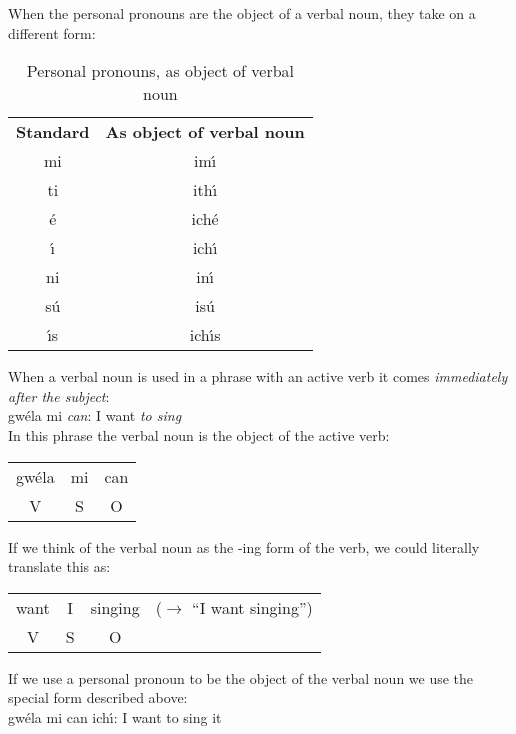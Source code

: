 When the personal pronouns are the object of a verbal noun, they take on a different form:
\begin{table}[H]
\centering
\begin{tabular}{cc}
  \toprule
  \textbf{Standard} & \textbf{As object of verbal noun}\\
  \cmidrule(lr){1-1}\cmidrule(lr){2-2}
  mi & im\'{\i}\\
  ti & ith\'{\i}\\
  \'{e} & ich\'{e}\\
  \'{\i} & ich\'{\i}\\
  ni & in\'{\i}\\
  s\'{u} & is\'{u}\\
  \'{\i}s & ich\'{\i}s\\
  \bottomrule
\end{tabular}
\caption{Personal pronouns, as object of verbal noun}
\label{personal_pronouns_as_object_of_verbal_noun}
\end{table}

When a verbal noun is used in a phrase with an active verb it comes \textit{immediately after the subject}:\\

gw\'{e}la mi \textit{can}: I want \textit{to sing}\\

In this phrase the verbal noun is the object of the active verb:
\begin{table}[H]
\begin{tabular}{ccc}
  gw\'{e}la & mi & can\\
  V & S & O
\end{tabular}
\label{verbal_noun_object_of_active_verb}
\end{table}

If we think of the verbal noun as the -ing form of the verb, we could literally translate this as:
\begin{table}[H]
\begin{tabular}{cccc}
  want & I & singing & ($\rightarrow$ ``I want singing'')\\
  V & S & O &
\end{tabular}
\label{verbal_noun_ing_form}
\end{table}

If we use a personal pronoun to be the object of the verbal noun we use the special form described above:\\
gw\'{e}la mi can ich\'{\i}: I want to sing it\\

